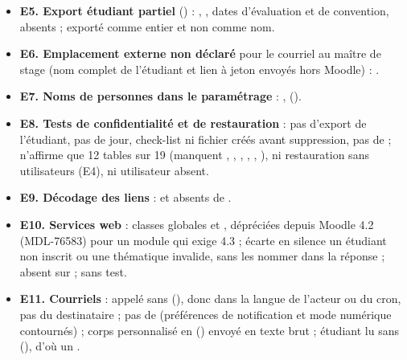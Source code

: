 \documentclass[11pt,a4paper]{article}
\newcommand{\grav}[1]{\textbf{\textcolor{#1}{\textbullet}}}
\newcommand{\mineure}{\grav{gray}}
\begin{document}
\begin{itemize}
    d'origine si le compte existe, comme le fait la restauration de .
  \item[\mineure] \textbf{E5. Export étudiant partiel} () :
    , , dates d'évaluation et de convention,
     absents ;  exporté comme entier et non comme nom.
  \item[\mineure] \textbf{E6. Emplacement externe non déclaré} pour le courriel au maître de stage
    (nom complet de l'étudiant et lien à jeton envoyés hors Moodle) :
    .
  \item[\mineure] \textbf{E7. Noms de personnes dans le paramétrage} :
    ,  ().
  \item[\mineure] \textbf{E8. Tests de confidentialité et de restauration} : pas d'export de
    l'étudiant, pas de jour, check-list ni fichier créés avant suppression, pas de
     ;  n'affirme que 12 tables sur 19
    (manquent , ,
    , ,
    , ), ni restauration sans
    utilisateurs (E4), ni utilisateur absent.
  \item[\mineure] \textbf{E9. Décodage des liens} :  et
     absents de .
  \item[\mineure] \textbf{E10. Services web} : classes globales  et
    , dépréciées depuis Moodle 4.2 (MDL-76583) pour un module qui exige
    4.3 ;  écarte en silence un étudiant non inscrit ou une
    thématique invalide, sans les nommer dans la réponse ;  absent sur
     ;  sans test.
  \item[\mineure] \textbf{E11. Courriels} :  appelé sans
     (), donc dans la langue
    de l'acteur ou du cron, pas du destinataire ; pas de  (préférences de
    notification et mode numérique contournés) ; corps personnalisé en 
    () envoyé en texte brut ; étudiant lu sans
     (), d'où un .
\end{itemize}
\end{document}
